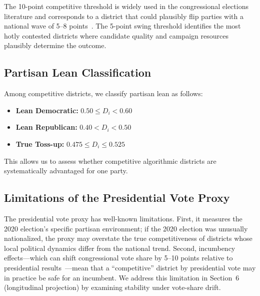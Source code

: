 The 10-point competitive threshold is widely used in the congressional
elections literature and corresponds to a district that could plausibly flip
parties with a national wave of 5--8 points~\citep{mcdonald2006new}.  The
5-point swing threshold identifies the most hotly contested districts where
candidate quality and campaign resources plausibly determine the outcome.

\subsection{Partisan Lean Classification}

Among competitive districts, we classify partisan lean as follows:
\begin{itemize}
  \item \textbf{Lean Democratic:} $0.50 \leq D_i < 0.60$
  \item \textbf{Lean Republican:} $0.40 < D_i < 0.50$
  \item \textbf{True Toss-up:} $0.475 \leq D_i \leq 0.525$
\end{itemize}
This allows us to assess whether competitive algorithmic districts are
systematically advantaged for one party.

\subsection{Limitations of the Presidential Vote Proxy}

The presidential vote proxy has well-known limitations.  First, it measures
the 2020 election's specific partisan environment; if the 2020 election was
unusually nationalized, the proxy may overstate the true competitiveness of
districts whose local political dynamics differ from the national trend.
Second, incumbency effects---which can shift congressional vote share by 5--10
points relative to presidential results~\citep{ansolabehere2000incumbency}---mean
that a ``competitive'' district by presidential vote may in practice be safe
for an incumbent.  We address this limitation in Section~6 (longitudinal
projection) by examining stability under vote-share drift.
